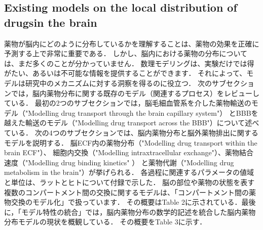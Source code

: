 \documentclass[11pt,a4paper]{jsarticle}
\begin{document}
\subsection{Existing models on the local distribution of drugsin the brain}
薬物が脳内にどのように分布しているかを理解することは、薬物の効果を正確に予測する上で非常に重要である．
しかし、脳内における薬物の分布については、まだ多くのことが分かっていません．
数理モデリングは、実験だけでは得がたい、あるいは不可能な情報を提供することができます．
それによって、モデルは研究中のメカニズムに対する洞察を得るのに役立つ．
次のサブセクションでは，脳内薬物分布に関する既存のモデル（関連するプロセス）をレビューしている．
最初の2つのサブセクションでは，脳毛細血管系を介した薬物輸送のモデル（"Modelling drug transport through the brain capillary system"）
とBBBを越えた輸送のモデル（"Modelling drug transport across the BBB"）について述べている．
次の4つのサブセクションでは、脳内薬物分布と脳外薬物排出に関するモデルを説明する．
脳ECF内の薬物分布（"Modelling drug transport within the brain ECF"）、
細胞内交換（"Modelling intraxtracellular exchange"）、薬物結合速度（"Modelling drug binding kinetics" ）
と薬物代謝（"Modelling drug metabolism in the brain"）が挙げられる．
各過程に関連するパラメータの値域と単位は、ラットとヒトについて付録で示した．
脳の部位や薬物の状態を表す複数のコンパートメント間の交換に関するモデルは、「コンパートメント間の薬物交換のモデル化」で扱っています．
その概要はTable 2に示されている．最後に，「モデル特性の統合」では，脳内薬物分布の数学的記述を統合した脳内薬物分布モデルの現状を概観している．
その概要をTable 3に示す．
\end{document}
